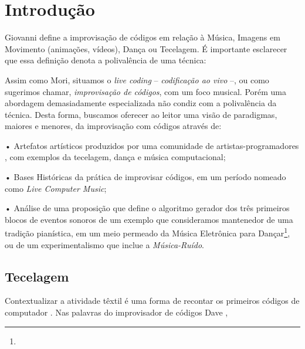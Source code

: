 \chapter*{Introdução}\label{cap:intro}

Giovanni  define a improvisação de códigos em relação à Música, Imagens em Movimento (animações, vídeos), Dança ou Tecelagem. É importante esclarecer que essa definição denota a polivalência de uma técnica:


Assim como Mori, situamos o \emph{live coding} -- \emph{codificação ao vivo} --, ou como sugerimos chamar, \emph{improvisação de códigos}, com um foco musical. Porém uma abordagem demasiadamente especializada não condiz com a polivalência da técnica. Desta forma, buscamos oferecer ao leitor uma visão de paradigmas, maiores e menores, da improvisação com códigos através de:

• Artefatos artísticos produzidos por uma comunidade de artistas-programadores \cite{prospero_social_2015}, com exemplos da tecelagem, dança e música computacional;

• Bases Históricas da prática de improvisar códigos, em um período nomeado como \emph{Live Computer Music};

• Análise de uma proposição que define o algoritmo gerador dos três primeiros blocos de eventos sonoros \cite{mclean_music_2006} de um exemplo que consideramos mantenedor de uma tradição pianística, em um meio permeado da Música Eletrônica para Dançar\footnote{}, ou de um experimentalismo que inclue a \emph{Música-Ruído}.


\section*{Tecelagem}

Contextualizar a atividade têxtil é uma forma de recontar os primeiros códigos de computador . Nas palavras do improvisador de códigos Dave ,

